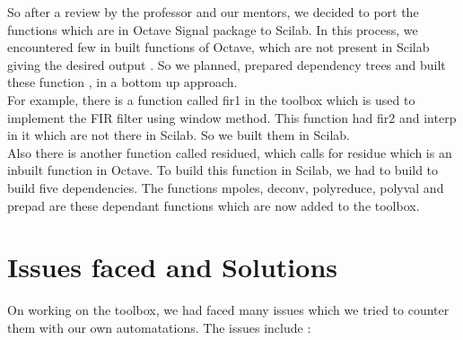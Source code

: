 \documentclass[12pt,a4paper]{report}
\begin{document}
So after a review by the professor and our mentors, we decided to port the functions which are in Octave Signal package to Scilab. In this process, we encountered few in built functions of Octave, which are not present in Scilab giving the desired output . So we planned, prepared dependency trees and built these function , in a bottom up approach.\\

For example, there is a function called fir1 in the toolbox which is used to implement the FIR filter using window method. This function had fir2 and interp in it which are not there in Scilab. So we built them in Scilab.\\
Also there is another function called residued, which calls for residue which is an inbuilt function in Octave. To build this function in Scilab, we had to build to build five dependencies. The functions mpoles, deconv, polyreduce, polyval and prepad are these dependant functions which are now added to the toolbox.\\




























\chapter{\textbf{Issues faced and Solutions}}
On working on the toolbox, we had faced many issues which we tried to counter them with our own automatations. The issues include :\\
\end{document}
